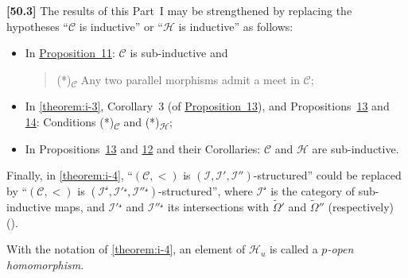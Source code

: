 \documentclass[a4paper,fleqn]{article}
\theoremstyle{plain}
\theoremstyle{definition}
\newenvironment{definition}[1]
  {\renewcommand\theinnerdefinition{#1}\innerdefinition}
  {\endinnerdefinition}
\newenvironment{longcomm}[1]
  {\noindent\textbf{[#1]}\rmfamily}
  {}
\newcommand{\oldpage}[1]{{\marginpar{\footnotesize$\bigg\vert$\,\,\,\,\textit{p.~#1}}}}
\newcommand{\CC}{\mathcal{C}}
\newcommand{\HH}{\mathcal{H}}
\newcommand{\II}{\mathcal{I}}
\begin{document}
\begin{longcomm}{50.3}
  The results of this Part~I may be strengthened by replacing the hypotheses ``$\CC$ is inductive'' or ``$\HH$ is inductive'' as follows:
  \begin{itemize}
    \item In \hyperref[proposition:i-11]{Proposition~11}:
      $\CC$ is sub-inductive and
      \begin{quote}
        (*)\textsubscript{$\CC$}
        Any two parallel morphisms admit a meet in $\CC$;
      \end{quote}

    \item In \cref{theorem:i-3}, Corollary~3 (of \hyperref[proposition:i-13]{Proposition~13}), and Propositions~\hyperref[proposition:i-13]{13} and \hyperref[proposition:i-14]{14}:
      Conditions (*)\textsubscript{$\CC$} and (*)\textsubscript{$\HH$};

    \item In Propositions~\hyperref[proposition:i-13]{13} and \hyperref[proposition:i-12]{12} and their Corollaries:
      $\CC$ and $\HH$ are sub-inductive.
  \end{itemize}

  Finally, in \cref{theorem:i-4}, ``$(\CC,<)$ is $(\II,\II',\II'')$-structured'' could be replaced by ``$(\CC,<)$ is $(\II^\mathcal{s},\II'{}^\mathcal{s},\II''{}^\mathcal{s})$-structured'', where $\II^\mathcal{s}$ is the category of sub-inductive maps, and $\II'{}^\mathcal{s}$ and $\II''{}^\mathcal{s}$ its intersections with $\widetilde{\Omega}'$ and $\widetilde{\Omega}''$ (respectively) (\cite{coll69}).
\end{longcomm}

\begin{definition}{10}
\label{definition:i-10}
  \oldpage{379}
  With the notation of \cref{theorem:i-4}, an element of $\HH_u$ is called a \emph{$p$-open homomorphism}.
\end{definition}
\end{document}
